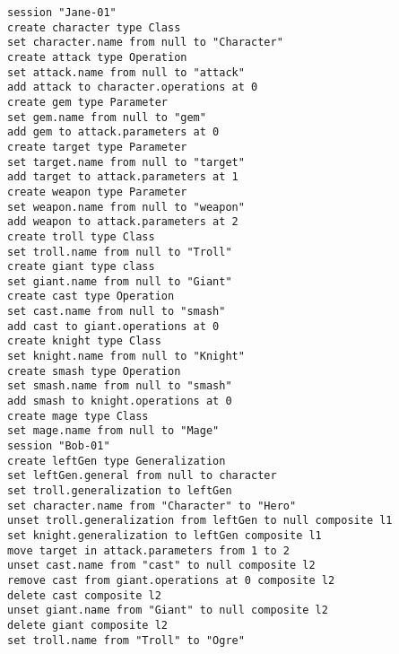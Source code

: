 \vspace{-20pt}
\begin{lstlisting}[style=eol,escapechar=|,caption={The complete version of Bob's change events in Listing \ref{lst:cbp_left}.},label=lst:cbp_left_full]
session "Jane-01"
create character type Class
set character.name from null to "Character" 
create attack type Operation
set attack.name from null to "attack" 
add attack to character.operations at 0
create gem type Parameter
set gem.name from null to "gem" 
add gem to attack.parameters at 0
create target type Parameter
set target.name from null to "target" 
add target to attack.parameters at 1
create weapon type Parameter
set weapon.name from null to "weapon" 
add weapon to attack.parameters at 2
create troll type Class
set troll.name from null to "Troll" 
create giant type class
set giant.name from null to "Giant"
create cast type Operation
set cast.name from null to "smash"
add cast to giant.operations at 0
create knight type Class
set knight.name from null to "Knight"
create smash type Operation
set smash.name from null to "smash"
add smash to knight.operations at 0
create mage type Class
set mage.name from null to "Mage" 
session "Bob-01"
create leftGen type Generalization
set leftGen.general from null to character
set troll.generalization to leftGen
set character.name from "Character" to "Hero"
unset troll.generalization from leftGen to null composite l1
set knight.generalization to leftGen composite l1
move target in attack.parameters from 1 to 2
unset cast.name from "cast" to null composite l2
remove cast from giant.operations at 0 composite l2
delete cast composite l2
unset giant.name from "Giant" to null composite l2
delete giant composite l2
set troll.name from "Troll" to "Ogre"
\end{lstlisting}

